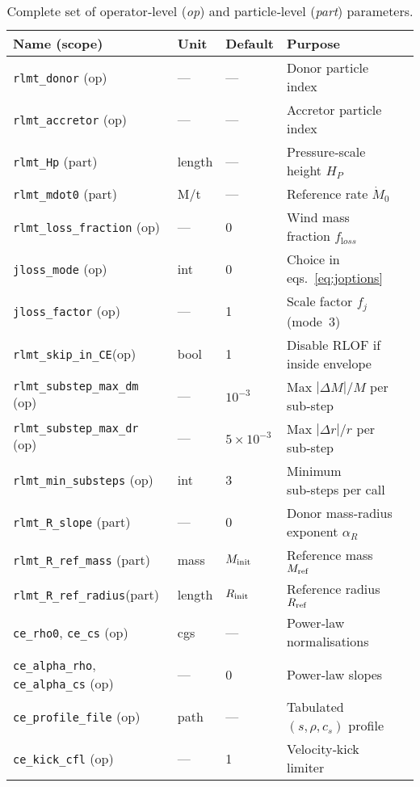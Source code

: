 \documentclass[11pt]{article}
\begin{document}
\begin{table}[h]
\centering\footnotesize
\caption{Complete set of operator‐level (\textit{op}) and
particle‑level (\textit{part}) parameters.}
\label{tab:params}
\begin{tabular}{@{}lllll@{}}
\toprule
Name (scope) & Unit & Default & Purpose \\
\midrule
\texttt{rlmt\_donor}      (op)   & —        & — & Donor particle index\\
\texttt{rlmt\_accretor}   (op)   & —        & — & Accretor particle index\\
\texttt{rlmt\_Hp}         (part) & length   & — & Pressure‐scale height $H_P$\\
\texttt{rlmt\_mdot0}      (part) & M/t      & — & Reference rate $\dot M_0$\\[0.2em]
%
\texttt{rlmt\_loss\_fraction} (op) & —      & 0 & Wind mass fraction $f_{\mathrm loss}$\\
\texttt{jloss\_mode}      (op)   & int      & 0 & Choice in eqs.~\eqref{eq:joptions}\\
\texttt{jloss\_factor}    (op)   & —        & 1 & Scale factor $f_j$ (mode 3)\\
\texttt{rlmt\_skip\_in\_CE}(op)  & bool     & 1 & Disable RLOF if inside envelope\\[0.2em]
%
\texttt{rlmt\_substep\_max\_dm} (op) & —    & $10^{-3}$ & Max $|\Delta M|/M$ per sub‑step\\
\texttt{rlmt\_substep\_max\_dr} (op) & —    & $5\times10^{-3}$ & Max $|\Delta r|/r$ per sub‑step\\
\texttt{rlmt\_min\_substeps}    (op) & int  & 3 & Minimum sub‑steps per call\\[0.2em]
%
\texttt{rlmt\_R\_slope}      (part) & —     & 0 & Donor mass‑radius exponent $\alpha_R$\\
\texttt{rlmt\_R\_ref\_mass}  (part) & mass  & $M_{\rm init}$ & Reference mass $M_{\rm ref}$\\
\texttt{rlmt\_R\_ref\_radius}(part) & length& $R_{\rm init}$ & Reference radius $R_{\rm ref}$\\[0.2em]
%
\texttt{ce\_rho0}, \texttt{ce\_cs}  (op) & cgs & — & Power‑law normalisations\\
\texttt{ce\_alpha\_rho}, \texttt{ce\_alpha\_cs} (op) & — & 0 & Power‑law slopes\\
\texttt{ce\_profile\_file}  (op) & path & — & Tabulated $(s,\rho,c_s)$ profile\\
\texttt{ce\_kick\_cfl}      (op) & — & 1 & Velocity‑kick limiter\\

\end{tabular}
\end{table}
\end{document}
